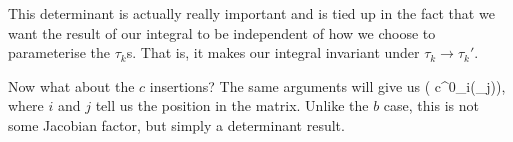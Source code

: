 This determinant is actually really important and is tied up in the fact that we want the result of our integral to be independent of how we choose to parameterise the $\tau_k$s. That is, it makes our integral invariant under $\tau_k \to \tau_k'$.

Now what about the $c$ insertions? The same arguments will give us 
\bse 
    \det\Big( c^0_i(\hat{\sig}_j)\Big),
\ese 
where $i$ and $j$ tell us the position in the matrix. Unlike the $b$ case, this is not some Jacobian factor, but simply a determinant result. 